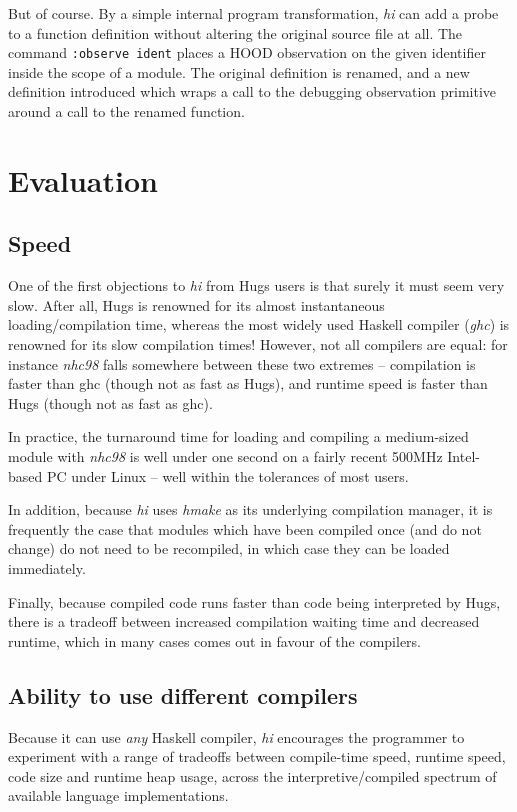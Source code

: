 \documentclass[a4paper]{llncs}
\begin{document}
But of course.  By a simple internal program transformation, {\em hi}
can add a probe to a function definition without altering the original
source file at all.  The command {\tt :observe ident} places a HOOD
observation on the given identifier inside the scope of a module.
The original definition is renamed, and a new definition introduced
which wraps a call to the debugging observation primitive around a call
to the renamed function.



\section{Evaluation}
\subsection{Speed}

One of the first objections to {\em hi} from Hugs users is that
surely it must seem very slow.  After all, Hugs is renowned for
its almost instantaneous loading/compilation time, whereas the most
widely used Haskell compiler ({\em ghc}) is renowned for its slow
compilation times!  However, not all compilers are equal: for instance
{\em nhc98} falls somewhere between these two extremes -- compilation
is faster than ghc (though not as fast as Hugs), and runtime speed is
faster than Hugs (though not as fast as ghc).

In practice, the turnaround time for loading and compiling a
medium-sized module with {\em nhc98} is well under one second on a
fairly recent 500MHz Intel-based PC under Linux -- well within the
tolerances of most users.

In addition, because {\em hi} uses {\em hmake} as its underlying
compilation manager, it is frequently the case that modules which have
been compiled once (and do not change) do not need to be recompiled,
in which case they can be loaded immediately.

Finally, because compiled code runs faster than code being interpreted
by Hugs, there is a tradeoff between increased compilation waiting
time and decreased runtime, which in many cases comes out in favour
of the compilers.


\subsection{Ability to use different compilers}

Because it can use {\em any} Haskell compiler, {\em hi} encourages the
programmer to experiment with a range of tradeoffs between compile-time
speed, runtime speed, code size and runtime heap usage, across the
interpretive/compiled spectrum of available language implementations.
\end{document}

